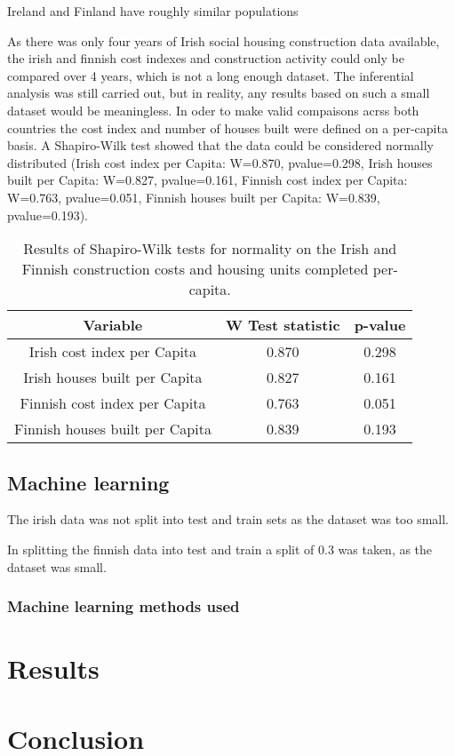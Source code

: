 \documentclass[hidelinks,12pt,oneside]{report} %
\begin{document}
Ireland and Finland have roughly similar populations

As there was only four years of Irish social housing construction data available, the irish and finnish cost indexes and construction activity could only be compared over 4 years, which is not a long enough dataset. The inferential analysis was still carried out, but in reality, any results based on such a small dataset would be meaningless. In oder to make valid compaisons acrss both countries the cost index and number of houses built were defined on a per-capita basis. A Shapiro-Wilk test showed that the data could be considered normally distributed (Irish cost index per Capita: W=0.870, pvalue=0.298, Irish houses built per Capita: W=0.827, pvalue=0.161, Finnish cost index per Capita: W=0.763, pvalue=0.051, Finnish houses built per Capita: W=0.839, pvalue=0.193).

\begin{table}[h!]
\centering
\begin{tabular}{||c | c | c ||} 
 \hline
 Variable & W Test statistic & p-value \\ [0.0ex] 
 \hline\hline
 Irish cost index per Capita & 0.870 & 0.298 \\ 
 \hline
 Irish houses built per Capita & 0.827 & 0.161 \\
 \hline
 Finnish cost index per Capita & 0.763 & 0.051 \\
 \hline
  Finnish houses built per Capita & 0.839 & 0.193 \\ [0.0ex] 
 \hline
\end{tabular}
\caption{Results of Shapiro-Wilk tests for normality on the Irish and Finnish construction costs and housing units completed per-capita.}
\label{table:1}
\end{table}
 
\section{Machine learning}
The irish data was not split into test and train sets as the dataset was too small.

In splitting the finnish data into test and train a split of 0.3 was taken, as the dataset was small.

\subsection{Machine learning methods used}

\chapter{Results}

\chapter{Conclusion}


\printbibliography
 
\end{document}
